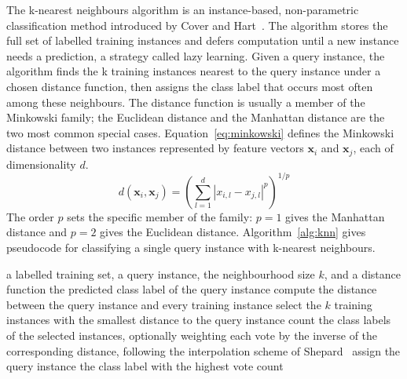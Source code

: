 \documentclass[10pt,conference]{IEEEtran}
\begin{document}
The k-nearest neighbours algorithm is an instance-based, non-parametric classification method introduced by Cover and Hart~\cite{cover1967}. The algorithm stores the full set of labelled training instances and defers computation until a new instance needs a prediction, a strategy called lazy learning. Given a query instance, the algorithm finds the k training instances nearest to the query instance under a chosen distance function, then assigns the class label that occurs most often among these neighbours. The distance function is usually a member of the Minkowski family; the Euclidean distance and the Manhattan distance are the two most common special cases. Equation~\eqref{eq:minkowski} defines the Minkowski distance between two instances represented by feature vectors $\mathbf{x}_i$ and $\mathbf{x}_j$, each of dimensionality $d$.
\begin{equation}
\label{eq:minkowski}
d(\mathbf{x}_i, \mathbf{x}_j) = \left( \sum_{l=1}^{d} |x_{i,l} - x_{j,l}|^{p} \right)^{1/p}
\end{equation}
The order $p$ sets the specific member of the family: $p=1$ gives the Manhattan distance and $p=2$ gives the Euclidean distance. Algorithm~\ref{alg:knn} gives pseudocode for classifying a single query instance with k-nearest neighbours.

\begin{algorithm}
\caption{Classification of a query instance with k-nearest neighbours}
\label{alg:knn}
\begin{algorithmic}[1]
\Require a labelled training set, a query instance, the neighbourhood size $k$, and a distance function
\Ensure the predicted class label of the query instance
\State compute the distance between the query instance and every training instance
\State select the $k$ training instances with the smallest distance to the query instance
\State count the class labels of the selected instances, optionally weighting each vote by the inverse of the corresponding distance, following the interpolation scheme of Shepard~\cite{shepard1968}
\State assign the query instance the class label with the highest vote count
\end{algorithmic}
\end{algorithm}
\end{document}
